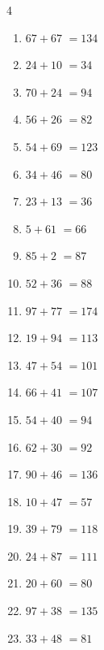 \begin{multicols}{4}
\begin{enumerate}
  \item $67+67$
        $=134$

  \item $24+10$
        $=34$

  \item $70+24$
        $=94$

  \item $56+26$
        $=82$

  \item $54+69$
        $=123$

  \item $34+46$
        $=80$

\columnbreak %

  \item $23+13$
        $=36$

  \item $5+61$
        $=66$

  \item $85+2$
        $=87$

  \item $52+36$
        $=88$

  \item $97+77$
        $=174$

  \item $19+94$
        $=113$

  \item $47+54$
        $=101$

  \item $66+41$
        $=107$

  \item $54+40$
        $=94$

  \item $62+30$
        $=92$

  \item $90+46$
        $=136$

  \item $10+47$
        $=57$

  \item $39+79$
        $=118$

  \item $24+87$
        $=111$

  \item $20+60$
        $=80$

  \item $97+38$
        $=135$

  \item $33+48$
        $=81$


\end{enumerate}
\end{multicols}
